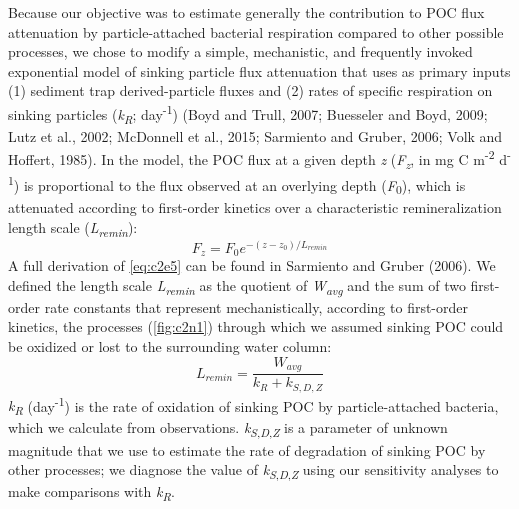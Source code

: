 Because our objective was to estimate generally the contribution to POC flux attenuation by particle-attached bacterial respiration compared to other possible processes, we chose to modify a simple, mechanistic, and frequently invoked exponential model of sinking particle flux attenuation that uses as primary inputs (1) sediment trap derived-particle fluxes and (2) rates of specific respiration on sinking particles (\emph{k\textsubscript{R}}; day\textsuperscript{-1}) (Boyd and Trull, 2007; Buesseler and Boyd, 2009; Lutz et al., 2002; McDonnell et al., 2015; Sarmiento and Gruber, 2006; Volk and Hoffert, 1985). In the model, the POC flux at a given depth \emph{z} (\emph{F\textsubscript{z}}, in mg C m\textsuperscript{-2} d\textsuperscript{-1}) is proportional to the flux observed at an overlying depth (\emph{F}\textsubscript{0}), which is attenuated according to first-order kinetics over a characteristic remineralization length scale (\emph{L\textsubscript{remin}}):
\begin{equation} \label{eq:c2e5}
{F_z} = {F_0}{e^{ - (z - {z_0})/{L_{remin}}}}
\end{equation}
A full derivation of \autoref{eq:c2e5} can be found in Sarmiento and Gruber (2006). We defined the length scale \emph{L\textsubscript{remin}} as the quotient of \emph{W\textsubscript{avg}} and the sum of two first-order rate constants that represent mechanistically, according to first-order kinetics, the processes (\autoref{fig:c2n1}) through which we assumed sinking POC could be oxidized or lost to the surrounding water column:
\begin{equation} \label{eq:c2e6}
{L_{remin}} = \frac{{{W_{avg}}}}{{{k_R} + {k_{S,D,Z}}}}
\end{equation}
\emph{k\textsubscript{R}} (day\textsuperscript{-1}) is the rate of oxidation of sinking POC by particle-attached bacteria, which we calculate from observations. \emph{k\textsubscript{S}}\textsubscript{,\emph{D},\emph{Z}} is a parameter of unknown magnitude that we use to estimate the rate of degradation of sinking POC by other processes; we diagnose the value of \emph{k\textsubscript{S}}\textsubscript{,\emph{D},\emph{Z}} using our sensitivity analyses to make comparisons with \emph{k\textsubscript{R}}.


